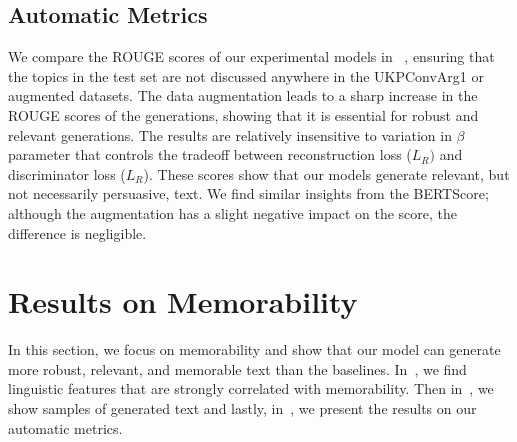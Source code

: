 \subsection{Automatic Metrics}
\label{subsec:si_pers_auto}
We compare the ROUGE scores of our experimental models in ~, ensuring that the topics in the test set are not discussed anywhere in the UKPConvArg1 or augmented datasets. The data augmentation leads to a sharp increase in the ROUGE scores of the generations, showing that it is essential for robust and relevant generations. The results are relatively insensitive to variation in $\beta$ parameter that controls the tradeoff between reconstruction loss ($L_R)$ and discriminator loss ($L_R$). These scores show that our models generate relevant, but not necessarily persuasive, text. We find similar insights from the BERTScore; although the augmentation has a slight negative impact on the score, the difference is negligible. 

\section{Results on Memorability}
\label{sec:mem_results}

In this section, we focus on memorability and show that our model can generate more robust, relevant, and memorable text than the baselines. In~, we find linguistic features that are strongly correlated with memorability. Then in~, we show samples of generated text and lastly, in~, we present the results on our automatic metrics.

